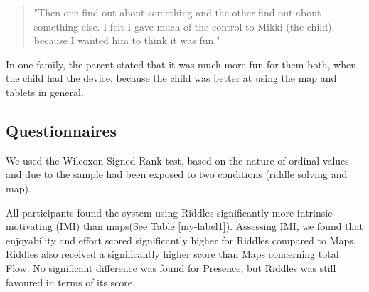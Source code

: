 \begin{quote}
    "Then one find out about something and the other find out about something else. I 
felt I gave much of the control to Mikki (the child), because I wanted him to think it 
was fun."
\end{quote}
 
In one family, the parent stated that it was much more fun for them both, when the child had the device, because the child was better at using the map and tablets in general.

\subsection{Questionnaires}
We used the Wilcoxon Signed-Rank test, based on the nature of ordinal values and due to the sample had been exposed to two conditions (riddle solving and map).

All participants found the system using Riddles significantly more intrinsic motivating (IMI) than maps(See Table \ref{my-label1}). Assessing IMI, we found that enjoyability and effort scored significantly higher for Riddles compared to Maps. Riddles also received a significantly higher score than Maps concerning total Flow. No significant difference was found for Presence, but Riddles was still favoured in terms of its score. 


